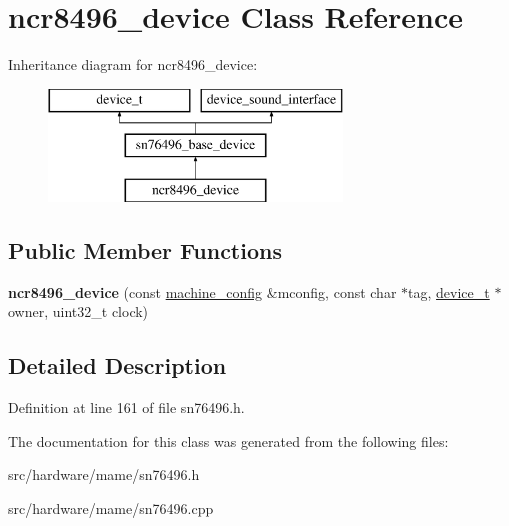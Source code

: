 \hypertarget{classncr8496__device}{\section{ncr8496\-\_\-device Class Reference}
\label{classncr8496__device}
}
Inheritance diagram for ncr8496\-\_\-device\-:\begin{figure}[H]
\begin{center}
\leavevmode
\includegraphics[height=3.000000cm]{classncr8496__device}
\end{center}
\end{figure}
\subsection*{Public Member Functions}
\begin{DoxyCompactItemize}
\item 
\hypertarget{classncr8496__device_a39aeaf1c1703749ebae17fb5e3736a71}{{\bfseries ncr8496\-\_\-device} (const \hyperlink{structmachine__config}{machine\-\_\-config} \&mconfig, const char $\ast$tag, \hyperlink{classdevice__t}{device\-\_\-t} $\ast$owner, uint32\-\_\-t clock)}\label{classncr8496__device_a39aeaf1c1703749ebae17fb5e3736a71}

\end{DoxyCompactItemize}


\subsection{Detailed Description}


Definition at line 161 of file sn76496.\-h.



The documentation for this class was generated from the following files\-:\begin{DoxyCompactItemize}
\item 
src/hardware/mame/sn76496.\-h\item 
src/hardware/mame/sn76496.\-cpp\end{DoxyCompactItemize}

